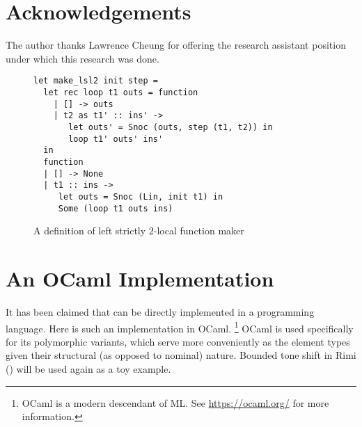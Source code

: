 \documentclass[11pt]{article}
\theoremstyle{definition}
\theoremstyle{plain}
\begin{document}
\section*{Acknowledgements}
The author thanks Lawrence Cheung for offering the research assistant
position under which this research was done.

\begin{figure*}
  \centering
\begin{verbatim}
let make_lsl2 init step =
  let rec loop t1 outs = function
    | [] -> outs
    | t2 as t1' :: ins' ->
       let outs' = Snoc (outs, step (t1, t2)) in
       loop t1' outs' ins'
  in
  function
  | [] -> None
  | t1 :: ins ->
     let outs = Snoc (Lin, init t1) in
     Some (loop t1 outs ins)
\end{verbatim}
  \caption{A definition of left strictly \(2\)-local function maker}
  \label{fig:def-fold}
\end{figure*}



\appendix
\section{An OCaml Implementation}
It has been claimed that  can be directly
implemented in a programming language.  Here is such an implementation
in OCaml.%
\footnote{OCaml is a modern descendant of ML.  See
  \url{https://ocaml.org/} for more information.}
%
OCaml is used specifically for its polymorphic variants, which serve
more conveniently as the element types given their structural (as
opposed to nominal) nature.  Bounded tone shift in Rimi
() will be used again as a toy example.
\end{document}
